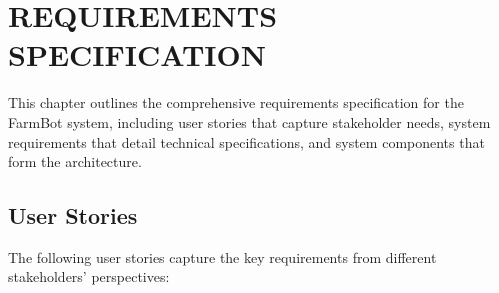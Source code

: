 \chapter{REQUIREMENTS SPECIFICATION}

This chapter outlines the comprehensive requirements specification for the FarmBot system, including user stories that capture stakeholder needs, system requirements that detail technical specifications, and system components that form the architecture.

\section{User Stories}

The following user stories capture the key requirements from different stakeholders' perspectives:

